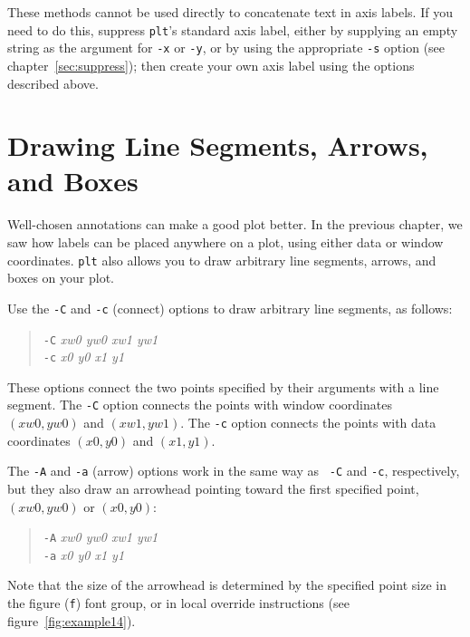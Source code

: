 \documentclass{book}
\begin{document}
These methods cannot be used directly to concatenate text in axis labels.
If you need to do this, suppress {\tt plt}'s standard axis label,
either by supplying an empty string as the argument for {\tt -x} or {\tt -y},
or by using the appropriate {\tt -s} option (see chapter~\ref{sec:suppress});
then create your own axis label using the options described above.

\chapter{Drawing Line Segments, Arrows, and Boxes \label{sec:lines-arrows}}

Well-chosen annotations can make a good plot better.  In the previous
chapter, we saw how labels can be placed anywhere on a plot, using
either data or window coordinates.  {\tt plt} also allows you to draw
arbitrary line segments, arrows, and boxes on your plot.

%
%
%
%
Use the {\tt -C} and {\tt -c} (connect) options to draw arbitrary line
segments, as follows:

\begin{quote}
{\tt -C} \emph{xw0 yw0 xw1 yw1}\\
{\tt -c} \emph{x0 y0 x1 y1}
\end{quote}

These options connect the two points specified by their arguments with a
line segment.  The {\tt -C} option connects the points with window
coordinates $(xw0,yw0)$ and $(xw1,yw1)$.  The {\tt -c} option connects
the points with data coordinates $(x0,y0)$ and $(x1,y1)$.

%
%
The {\tt -A} and {\tt -a} (arrow) options work in the same way as {\tt
-C} and {\tt -c}, respectively, but they also draw an arrowhead
pointing toward the first specified point, $(xw0,yw0)$ or $(x0,y0)$:

\begin{quote}
{\tt -A} \emph{xw0 yw0 xw1 yw1}\\
{\tt -a} \emph{x0 y0 x1 y1}
\end{quote}

Note that the size of the arrowhead is determined by the specified
point size in the figure ({\tt f}) font group, or in local override
instructions (see figure~\ref{fig:example14}).
\end{document}
